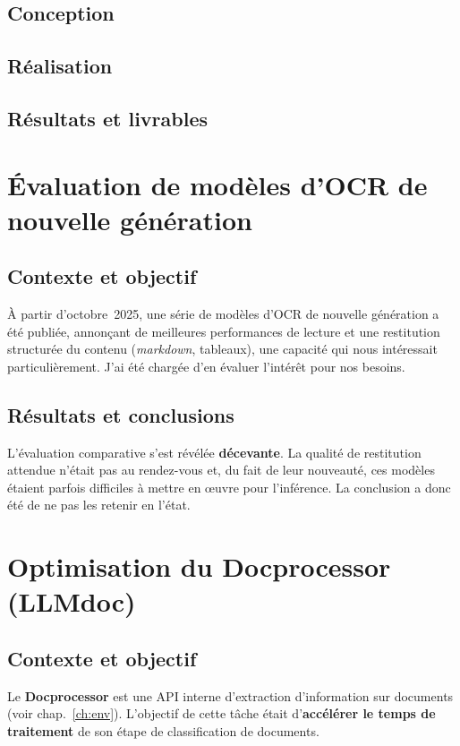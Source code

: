 \subsection{Conception}

\subsection{Réalisation}

\subsection{Résultats et livrables}

\section{Évaluation de modèles d'OCR de nouvelle génération}

\subsection{Contexte et objectif}
À partir d'octobre~2025, une série de modèles d'OCR de nouvelle génération a été
publiée, annonçant de meilleures performances de lecture et une restitution
structurée du contenu (\emph{markdown}, tableaux), une capacité qui nous intéressait
particulièrement. J'ai été chargée d'en évaluer l'intérêt pour nos besoins.

\subsection{Résultats et conclusions}
L'évaluation comparative s'est révélée \textbf{décevante}. La qualité de restitution
attendue n'était pas au rendez-vous et, du fait de leur nouveauté, ces modèles
étaient parfois difficiles à mettre en \oe uvre pour l'inférence. La conclusion a donc
été de ne pas les retenir en l'état.

\section{Optimisation du Docprocessor (LLMdoc)}

\subsection{Contexte et objectif}
Le \textbf{Docprocessor} est une API interne d'extraction d'information sur documents
(voir chap.~\ref{ch:env}). L'objectif de cette tâche était d'\textbf{accélérer le
temps de traitement} de son étape de classification de documents.

